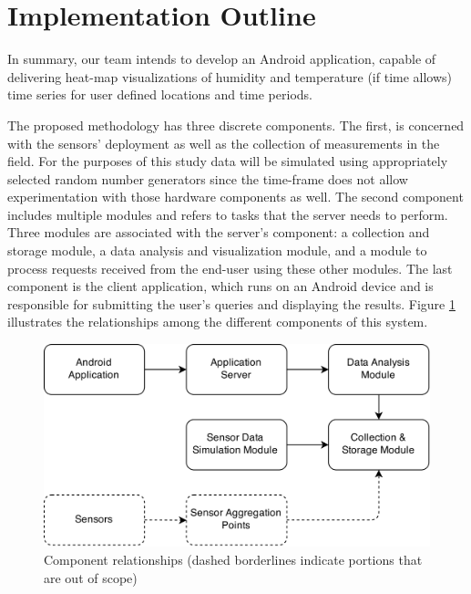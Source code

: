 \documentclass{article}
\begin{document}
\section{Implementation Outline}

In summary, our team intends to develop an Android application, capable of delivering heat-map visualizations of humidity and temperature (if time allows) time series for user defined locations and time periods. 

The proposed methodology has three discrete components. The first, is concerned with the sensors’ deployment as well as the collection of measurements in the field. For the purposes of this study data will be simulated using appropriately selected random number generators since the time-frame does not allow experimentation with those hardware components as well. The second component includes multiple modules and refers to tasks that the server needs to perform. Three modules are associated with the server’s component: a collection and storage module, a data analysis and visualization module, and a module to process requests received from the end-user using these other modules. The last component is the client application, which runs on an Android device and is responsible for submitting the user’s queries and displaying the results. 
Figure \ref{fig:module-relationships} illustrates the relationships among the different components of this system.

\begin{figure}[htb]
\begin{center}
   \includegraphics[width=1\linewidth]{Images/module-relationships.png}
\end{center}
\vspace{-0.2in}
   \caption{Component relationships (dashed borderlines indicate portions that are out of scope)}
   \label{fig:module-relationships}
\end{figure}
\end{document}
